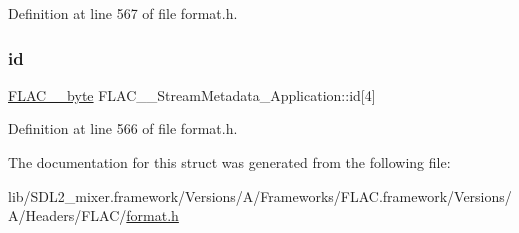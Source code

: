 Definition at line 567 of file format.\+h.

\mbox{\label{struct_f_l_a_c_____stream_metadata___application_a0af01573d097b37b48b4a414318ec2ec}} 
\subsubsection{\texorpdfstring{id}{id}}
{\footnotesize\ttfamily \mbox{\hyperlink{ordinals_8h_a5eb569b12d5b047cdacada4d57924ee3}{F\+L\+A\+C\+\_\+\+\_\+byte}} F\+L\+A\+C\+\_\+\+\_\+\+Stream\+Metadata\+\_\+\+Application\+::id\mbox{[}4\mbox{]}}



Definition at line 566 of file format.\+h.



The documentation for this struct was generated from the following file\+:\begin{DoxyCompactItemize}
\item 
lib/\+S\+D\+L2\+\_\+mixer.\+framework/\+Versions/\+A/\+Frameworks/\+F\+L\+A\+C.\+framework/\+Versions/\+A/\+Headers/\+F\+L\+A\+C/\mbox{\hyperlink{format_8h}{format.\+h}}\end{DoxyCompactItemize}
